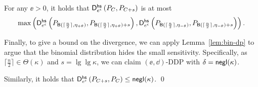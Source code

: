 \begin{corollary}\label{col:APBM}
For any $\ee>0$, it holds that 
    $\mathsf{D}^\mathsf{hs}_{e^\epsilon}\left({P_{C}}, {P_{C + s}}\right)$ is at most 
\begin{align*}
    \max \left( 
    \mathsf{D}^\mathsf{hs}_{e^\epsilon}\left({P_{\mathsf{B}(\lceil\frac{n}{2}\rceil, {\eta_{+\theta}})}}, {P_{\mathsf{B}(\lceil\frac{n}{2}\rceil, {\eta_{+\theta}})+s}}\right),
    \mathsf{D}^\mathsf{hs}_{e^\epsilon}\left({P_{\mathsf{B}(\lceil\frac{n}{2}\rceil, \eta_{-\theta})}}, {P_{\mathsf{B}(\lceil\frac{n}{2}\rceil, \eta_{-\theta})+s}}\right) \right).
\end{align*}
\end{corollary}

Finally, to give a bound on the divergence, we can apply Lemma~\ref{lem:bin-dp} to argue that the binomial distribution hides the small sensitivity. Specifically, as $\lceil\frac{n}{2}\rceil \in \Theta(\kappa)$ and $s =\lg\lg\kappa$, we can claim $(\ee, \dd)$-DDP with $\delta = \mathsf{negl}(\kappa)$.

Similarly, it holds that $\mathsf{D}^\mathsf{hs}_{e^\epsilon}\left({P_{C+s}}, {P_{C}}\right) \le
\mathsf{negl}(\kappa)$. \qed 
